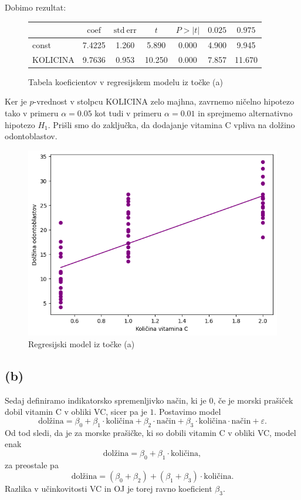 \documentclass[10pt, a4paper]{article}
\begin{document}
Dobimo rezultat:

\begin{figure}[H]
    \centering
    \begin{tabular}{lSSSSSS} \toprule
        & $\mathrm{coef}$ & $\mathrm{std\ err}$ & {$t$} & {$P > |t|$} & {$0.025$} & {$0.975$} \\ \midrule
        const  & 7.4225 & 1.260 & 5.890 & 0.000 & 4.900 & 9.945 \\
        KOLICINA  & 9.7636  & 0.953 & 10.250 & 0.000 & 7.857 & 11.670 \\ 
        \bottomrule
    \end{tabular}   
    \caption{Tabela koeficientov v regresijskem modelu iz točke (a)} 
\end{figure}

Ker je $p$-vrednost v stolpcu KOLICINA zelo majhna, zavrnemo ničelno hipotezo tako v primeru 
$\alpha = 0.05$ kot tudi v primeru $\alpha = 0.01$ in sprejmemo alternativno hipotezo $H_1$.
Prišli smo do zaključka, da dodajanje vitamina C vpliva na dolžino odontoblastov.

\begin{figure}[H]
    \centering
    \includegraphics[scale=0.75]{Images/3a.png}
    \caption{Regresijski model iz točke (a)}
\end{figure}

\subsection*{(b)}

Sedaj definiramo indikatorsko spremenljivko $\mathrm{način}$, ki je $0$, če je morski prašiček 
dobil vitamin C v obliki VC, sicer pa je $1$. Postavimo model 
$$\mathrm{dolžina} = \beta_0 + \beta_1 \cdot \mathrm{količina} + \beta_2 \cdot \mathrm{način}+ \beta_3 \cdot \mathrm{količina} \cdot \mathrm{način} + \varepsilon.$$
Od tod sledi, da je za morske prašičke, ki so dobili vitamin C v obliki VC, model enak
$$\mathrm{dolžina} = \beta_0 + \beta_1 \cdot \mathrm{količina},$$
za preostale pa 
$$\mathrm{dolžina} = (\beta_0 + \beta_2) + (\beta_1 + \beta_3) \cdot \mathrm{količina}.$$
Razlika v učinkovitosti VC in OJ je torej ravno koeficient $\beta_3$.
\end{document}

